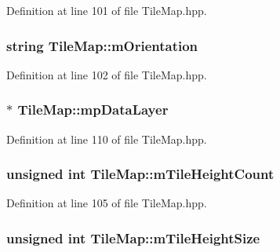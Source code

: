Definition at line 101 of file Tile\-Map.\-hpp.

\hypertarget{class_tile_map_a57c00e3034715bdd4feeb0ea6170829f}{
\subsubsection[{m\-Orientation}]{\setlength{\rightskip}{0pt plus 5cm}string Tile\-Map\-::m\-Orientation\hspace{0.3cm}{\ttfamily [protected]}}}\label{class_tile_map_a57c00e3034715bdd4feeb0ea6170829f}


Definition at line 102 of file Tile\-Map.\-hpp.

\hypertarget{class_tile_map_a8a388c1792d2170c8c5b27098f4ef439}{
\subsubsection[{mp\-Data\-Layer}]{$\ast$ Tile\-Map\-::mp\-Data\-Layer\hspace{0.3cm}{\ttfamily [protected]}}}\label{class_tile_map_a8a388c1792d2170c8c5b27098f4ef439}


Definition at line 110 of file Tile\-Map.\-hpp.

\hypertarget{class_tile_map_a2d6863a88f0ce522376c1d90c448a385}{
\subsubsection[{m\-Tile\-Height\-Count}]{\setlength{\rightskip}{0pt plus 5cm}unsigned int Tile\-Map\-::m\-Tile\-Height\-Count\hspace{0.3cm}{\ttfamily [protected]}}}\label{class_tile_map_a2d6863a88f0ce522376c1d90c448a385}


Definition at line 105 of file Tile\-Map.\-hpp.

\hypertarget{class_tile_map_a74b8c66dd13864f60cea068a8872499d}{
\subsubsection[{m\-Tile\-Height\-Size}]{\setlength{\rightskip}{0pt plus 5cm}unsigned int Tile\-Map\-::m\-Tile\-Height\-Size\hspace{0.3cm}{\ttfamily [protected]}}}\label{class_tile_map_a74b8c66dd13864f60cea068a8872499d}


